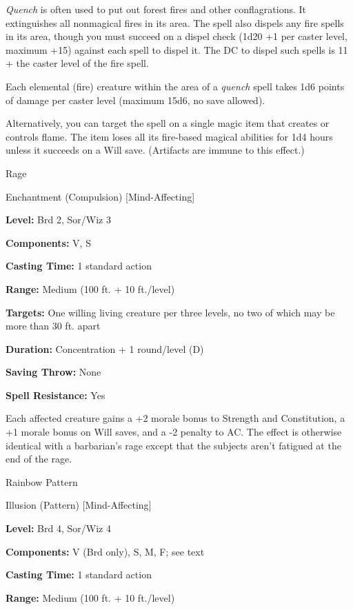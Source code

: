 \documentclass{article}
\begin{document}
\textit{Quench }is often used to put out forest fires and other conflagrations. 
It extinguishes all nonmagical fires in its area. The spell also dispels any fire 
spells in its area, though you must succeed on a dispel check (1d20 +1 per caster 
level, maximum +15) against each spell to dispel it. The DC to dispel such spells 
is 11 + the caster level of the fire spell.

Each elemental (fire) creature within the area of a \textit{quench }spell takes 
1d6 points of damage per caster level (maximum 15d6, no save allowed).

Alternatively, you can target the spell on a single magic item that creates or 
controls flame\textit{. }The item loses all its fire-based magical abilities for 
1d4 hours unless it succeeds on a Will save. (Artifacts are immune to this effect.)

\vspace{12pt}
Rage

Enchantment (Compulsion) [Mind-Affecting]

\textbf{Level:} Brd 2, Sor/Wiz 3

\textbf{Components:} V, S

\textbf{Casting Time:} 1 standard action

\textbf{Range: }Medium (100 ft. + 10 ft./level)

\textbf{Targets:} One willing living creature per three levels, no two of which 
may be more than 30 ft. apart

\textbf{Duration:} Concentration + 1 round/level (D)

\textbf{Saving Throw:} None

\textbf{Spell Resistance:} Yes

Each affected creature gains a +2 morale bonus to Strength and Constitution, a 
+1 morale bonus on Will saves, and a -2 penalty to AC. The effect is otherwise 
identical with a barbarian's rage except that the subjects aren't fatigued at the 
end of the rage.

\vspace{12pt}
Rainbow Pattern

Illusion (Pattern) [Mind-Affecting]

\textbf{Level:} Brd 4, Sor/Wiz 4

\textbf{Components:} V (Brd only), S, M, F; see text

\textbf{Casting Time:} 1 standard action

\textbf{Range: }Medium (100 ft. + 10 ft./level)
\end{document}
